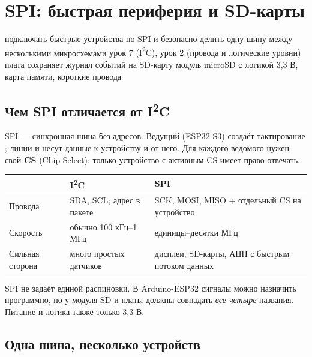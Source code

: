 \section{SPI: быстрая периферия и SD-карты}
\lessonintro
  {подключать быстрые устройства по SPI и безопасно делить одну шину между несколькими микросхемами}
  {урок 7 (I\textsuperscript{2}C), урок 2 (провода и логические уровни)}
  {плата сохраняет журнал событий на SD-карту}
  {модуль microSD с логикой 3,3 В, карта памяти, короткие провода}

\subsection{Чем SPI отличается от I\textsuperscript{2}C}

SPI --- синхронная шина без адресов. Ведущий (ESP32-S3) создаёт тактирование ; линии
 и  несут данные к устройству и от него. Для каждого ведомого нужен свой
\textbf{CS} (Chip Select): только устройство с активным CS имеет право отвечать.

\begin{center}\small
\begin{tabularx}{\textwidth}{@{}l X X@{}}
\toprule
 & I\textsuperscript{2}C & SPI \\
\midrule
Провода & SDA, SCL; адрес в пакете & SCK, MOSI, MISO + отдельный CS на устройство \\
Скорость & обычно 100 кГц--1 МГц & единицы--десятки МГц \\
Сильная сторона & много простых датчиков & дисплеи, SD-карты, АЦП с быстрым потоком данных \\
\bottomrule
\end{tabularx}
\end{center}

\begin{caution}
SPI не задаёт единой распиновки. В Arduino-ESP32 сигналы можно назначить программно, но у модуля
SD и платы должны совпадать \emph{все четыре} названия. Питание и логика также только 3,3 В.
\end{caution}

\subsection{Одна шина, несколько устройств}

